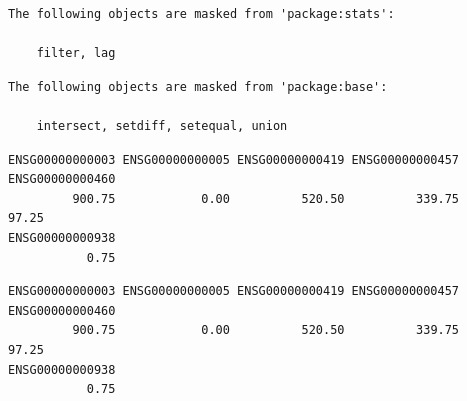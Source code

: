 \documentclass[
  letterpaper,
  DIV=11,
  numbers=noendperiod]{scrartcl}
\newenvironment{Shaded}{\begin{snugshade}}{\end{snugshade}}
\newcommand{\DecValTok}[1]{\textcolor[rgb]{0.68,0.00,0.00}{#1}}
\newcommand{\FunctionTok}[1]{\textcolor[rgb]{0.28,0.35,0.67}{#1}}
\newcommand{\NormalTok}[1]{\textcolor[rgb]{0.00,0.23,0.31}{#1}}
\newcommand{\OtherTok}[1]{\textcolor[rgb]{0.00,0.23,0.31}{#1}}
\newcommand{\SpecialCharTok}[1]{\textcolor[rgb]{0.37,0.37,0.37}{#1}}
\newcommand{\StringTok}[1]{\textcolor[rgb]{0.13,0.47,0.30}{#1}}
\begin{document}
\begin{verbatim}
The following objects are masked from 'package:stats':

    filter, lag
\end{verbatim}

\begin{verbatim}
The following objects are masked from 'package:base':

    intersect, setdiff, setequal, union
\end{verbatim}

\begin{Shaded}
\end{Shaded}

\begin{verbatim}
ENSG00000000003 ENSG00000000005 ENSG00000000419 ENSG00000000457 ENSG00000000460 
         900.75            0.00          520.50          339.75           97.25 
ENSG00000000938 
           0.75 
\end{verbatim}

\begin{Shaded}
\end{Shaded}

\begin{verbatim}
ENSG00000000003 ENSG00000000005 ENSG00000000419 ENSG00000000457 ENSG00000000460 
         900.75            0.00          520.50          339.75           97.25 
ENSG00000000938 
           0.75 
\end{verbatim}
\end{document}
